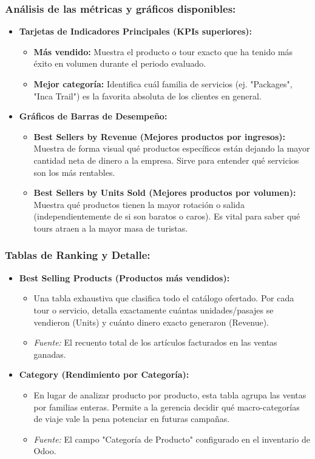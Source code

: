 \subsubsection*{Análisis de las métricas y gráficos disponibles:}
\begin{itemize}[leftmargin=*]
    \item \textbf{Tarjetas de Indicadores Principales (KPIs superiores):}
    \begin{itemize}
        \item \textbf{Más vendido:} Muestra el producto o tour exacto que ha tenido más éxito en volumen durante el periodo evaluado.
        \item \textbf{Mejor categoría:} Identifica cuál familia de servicios (ej. "Packages", "Inca Trail") es la favorita absoluta de los clientes en general.
    \end{itemize}
    \item \textbf{Gráficos de Barras de Desempeño:}
    \begin{itemize}
        \item \textbf{Best Sellers by Revenue (Mejores productos por ingresos):} Muestra de forma visual qué productos específicos están dejando la mayor cantidad neta de dinero a la empresa. Sirve para entender qué servicios son los más rentables.
        \item \textbf{Best Sellers by Units Sold (Mejores productos por volumen):} Muestra qué productos tienen la mayor rotación o salida (independientemente de si son baratos o caros). Es vital para saber qué tours atraen a la mayor masa de turistas.
    \end{itemize}
\end{itemize}

\subsubsection*{Tablas de Ranking y Detalle:}
\begin{itemize}[leftmargin=*]
    \item \textbf{Best Selling Products (Productos más vendidos):}
    \begin{itemize}
        \item Una tabla exhaustiva que clasifica todo el catálogo ofertado. Por cada tour o servicio, detalla exactamente cuántas unidades/pasajes se vendieron (Units) y cuánto dinero exacto generaron (Revenue).
        \item \textit{Fuente:} El recuento total de los artículos facturados en las ventas ganadas.
    \end{itemize}
    \item \textbf{Category (Rendimiento por Categoría):}
    \begin{itemize}
        \item En lugar de analizar producto por producto, esta tabla agrupa las ventas por familias enteras. Permite a la gerencia decidir qué macro-categorías de viaje vale la pena potenciar en futuras campañas.
        \item \textit{Fuente:} El campo "Categoría de Producto" configurado en el inventario de Odoo.
    \end{itemize}
\end{itemize}

